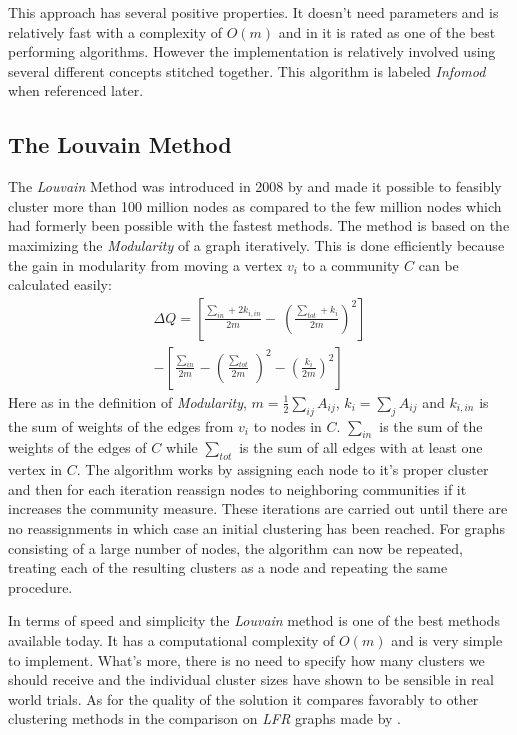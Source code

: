 This approach has several positive properties. It doesn't need 
parameters and is relatively fast with a complexity of $O(m)$ and in 
\cite{lancichinetti2009} it is rated as one of the best performing 
algorithms. However the implementation is relatively involved using 
several different concepts stitched together. This algorithm is labeled 
\emph{Infomod} when referenced later.

\subsection{The Louvain Method}
The \emph{Louvain} Method was introduced in 2008 by \cite{blondel2008} 
and made it possible to feasibly cluster more than 100 million nodes as 
compared to the few million nodes which had formerly been possible with 
the fastest methods. The method is based on the maximizing the 
\emph{Modularity} of a graph iteratively. This is done efficiently 
because the gain in modularity from moving a vertex $v_i$ to a community 
$C$ can be calculated easily:
\begin{multline}
	\Delta Q = \left[ \frac{\sum_{in} + 2 k_{i,in}}{2m} - \
	\left(\frac{\sum_{tot} + k_i}{2m} \right)^2 \right] \\
	- \left[\frac{\sum_{in}}{2m} - \left(\frac{\sum_{tot}}{2m} \
	\right)^2 - \left( \frac{k_i}{2m} \right)^2 \right]
\end{multline}
Here as in the definition of \emph{Modularity}, $m=\frac{1}{2} \sum_{ij} 
A_{ij}$, $k_i = \sum_j A_{ij}$ and $k_{i,in}$ is the sum of weights of 
the edges from $v_i$ to nodes in $C$.  $\sum_{in}$ is the sum of the 
weights of the edges of $C$ while $\sum_{tot}$ is the sum of all edges 
with at least one vertex in $C$.  The algorithm works by assigning each 
node to it's proper cluster and then for each iteration reassign nodes 
to neighboring communities if it increases the community measure.  These 
iterations are carried out until there are no reassignments in which 
case an initial clustering has been reached.  For graphs consisting of a 
large number of nodes, the algorithm can now be repeated, treating each 
of the resulting clusters as a node and repeating the same procedure.

In terms of speed and simplicity the \emph{Louvain} method is one of the 
best methods available today. It has a computational complexity of 
$O(m)$ and is very simple to implement. What's more, there is no need to 
specify how many clusters we should receive and the individual cluster 
sizes have shown to be sensible in real world trials.  As for the 
quality of the solution it compares favorably to other clustering 
methods in the comparison on \emph{LFR} graphs made by 
\cite{lancichinetti2009}.


